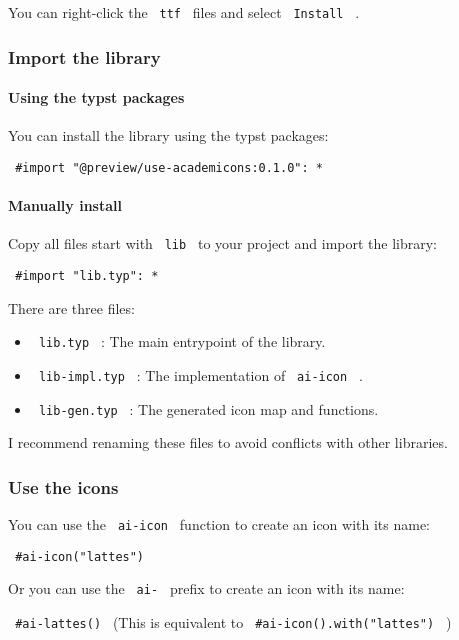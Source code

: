 You can right-click the \texttt{\ ttf\ } files and select
\texttt{\ Install\ } .

\subsubsection{Import the library}\label{import-the-library}

\paragraph{Using the typst packages}\label{using-the-typst-packages}

You can install the library using the typst packages:

\texttt{\ \#import\ "@preview/use-academicons:0.1.0":\ *\ }

\paragraph{Manually install}\label{manually-install}

Copy all files start with \texttt{\ lib\ } to your project and import
the library:

\texttt{\ \#import\ "lib.typ":\ *\ }

There are three files:

\begin{itemize}
\tightlist
\item
  \texttt{\ lib.typ\ } : The main entrypoint of the library.
\item
  \texttt{\ lib-impl.typ\ } : The implementation of \texttt{\ ai-icon\ }
  .
\item
  \texttt{\ lib-gen.typ\ } : The generated icon map and functions.
\end{itemize}

I recommend renaming these files to avoid conflicts with other
libraries.

\subsubsection{Use the icons}\label{use-the-icons}

You can use the \texttt{\ ai-icon\ } function to create an icon with its
name:

\texttt{\ \#ai-icon("lattes")\ }

Or you can use the \texttt{\ ai-\ } prefix to create an icon with its
name:

\texttt{\ \#ai-lattes()\ } (This is equivalent to
\texttt{\ \#ai-icon().with("lattes")\ } )

